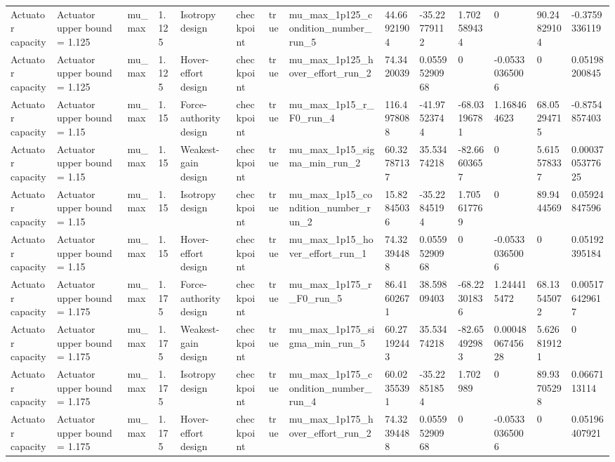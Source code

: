 \begin{tabular}{@{}llllllllllllll@{}}
Actuator capacity & Actuator upper bound = 1.125 & mu\_max & 1.125 & Isotropy design & checkpoint & true & mu\_max\_1p125\_condition\_number\_run\_5 & 44.66921904 & -35.22779112 & 1.702589434 & 0 & 90.24829104 & -0.3759336119 \\
Actuator capacity & Actuator upper bound = 1.125 & mu\_max & 1.125 & Hover-effort design & checkpoint & true & mu\_max\_1p125\_hover\_effort\_run\_2 & 74.3420039 & 0.05595290968 & 0 & -0.05330365006 & 0 & 0.05198200845 \\
Actuator capacity & Actuator upper bound = 1.15 & mu\_max & 1.15 & Force-authority design & checkpoint & true & mu\_max\_1p15\_r\_F0\_run\_4 & 116.4978088 & -41.97523744 & -68.03196781 & 1.168464623 & 68.05294715 & -0.8754857403 \\
Actuator capacity & Actuator upper bound = 1.15 & mu\_max & 1.15 & Weakest-gain design & checkpoint & true & mu\_max\_1p15\_sigma\_min\_run\_2 & 60.32787137 & 35.53474218 & -82.66603657 & 0 & 5.615578337 & 0.0003705377625 \\
Actuator capacity & Actuator upper bound = 1.15 & mu\_max & 1.15 & Isotropy design & checkpoint & true & mu\_max\_1p15\_condition\_number\_run\_2 & 15.82845036 & -35.22845194 & 1.705617769 & 0 & 89.9444569 & 0.05924847596 \\
Actuator capacity & Actuator upper bound = 1.15 & mu\_max & 1.15 & Hover-effort design & checkpoint & true & mu\_max\_1p15\_hover\_effort\_run\_1 & 74.32394488 & 0.05595290968 & 0 & -0.05330365006 & 0 & 0.05192395184 \\
Actuator capacity & Actuator upper bound = 1.175 & mu\_max & 1.175 & Force-authority design & checkpoint & true & mu\_max\_1p175\_r\_F0\_run\_5 & 86.41602671 & 38.59809403 & -68.22301836 & 1.244415472 & 68.13545072 & 0.005176429617 \\
Actuator capacity & Actuator upper bound = 1.175 & mu\_max & 1.175 & Weakest-gain design & checkpoint & true & mu\_max\_1p175\_sigma\_min\_run\_5 & 60.27192443 & 35.53474218 & -82.65492983 & 0.0004806745628 & 5.626819121 & 0 \\
Actuator capacity & Actuator upper bound = 1.175 & mu\_max & 1.175 & Isotropy design & checkpoint & true & mu\_max\_1p175\_condition\_number\_run\_4 & 60.02355391 & -35.22851854 & 1.702989 & 0 & 89.93705298 & 0.0667113114 \\
Actuator capacity & Actuator upper bound = 1.175 & mu\_max & 1.175 & Hover-effort design & checkpoint & true & mu\_max\_1p175\_hover\_effort\_run\_2 & 74.32394488 & 0.05595290968 & 0 & -0.05330365006 & 0 & 0.05196407921 \\

\end{tabular}
